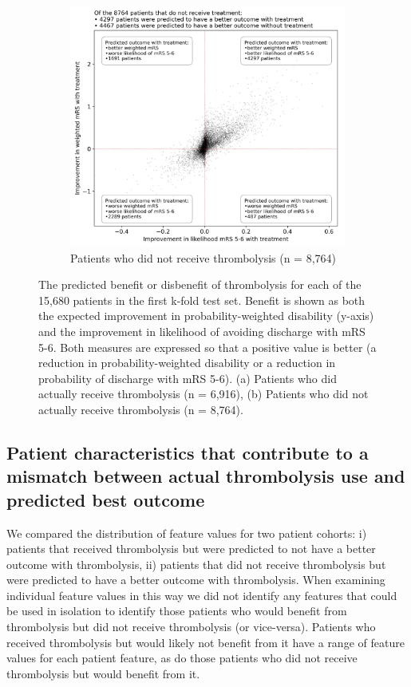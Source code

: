 \begin{figure}
\begin{subfigure}{.7\textwidth}
  \centering
  \captionsetup{width=.9\linewidth}
  \includegraphics[trim={0 0 0 1.7cm}, clip, width=1\linewidth]{./images/p4_scatter_not_treated}
  \caption{\footnotesize{Patients who did not receive thrombolysis (n = 8,764)}}
  \label{fig:scatter_not_receive}
\end{subfigure}
  \caption{The predicted benefit or disbenefit of thrombolysis for each of the 15,680 patients in the first k-fold test set. Benefit is shown as both the expected improvement in probability-weighted disability (y-axis) and the improvement in likelihood of avoiding discharge with mRS 5-6. Both measures are expressed so that a positive value is better (a reduction in probability-weighted disability or a reduction in probability of discharge with mRS 5-6). (a) Patients who did actually receive thrombolysis (n = 6,916), (b) Patients who did not actually receive thrombolysis (n = 8,764).}
\label{fig:scatter_all}
\end{figure}

\subsection{Patient characteristics that contribute to a mismatch between actual thrombolysis use and predicted best outcome}

We compared the distribution of feature values for two patient cohorts: i) patients that received thrombolysis but were predicted to not have a better outcome with thrombolysis, ii) patients that did not receive thrombolysis but were predicted to have a better outcome with thrombolysis. When examining individual feature values in this way we did not identify any features that could be used in isolation to identify those patients who would benefit from thrombolysis but did not receive thrombolysis (or vice-versa). Patients who received thrombolysis but would likely not benefit from it have a range of feature values for each patient feature, as do those patients who did not receive thrombolysis but would benefit from it.

